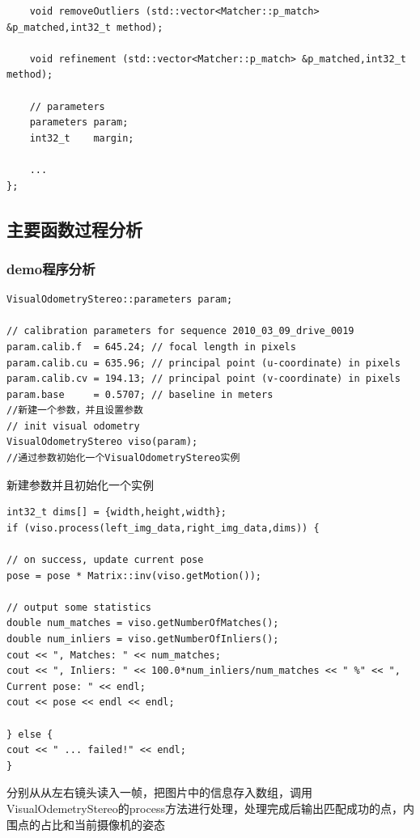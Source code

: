 \documentclass[UTF8]{ctexart}
\begin{document}
\begin{verbatim}
    void removeOutliers (std::vector<Matcher::p_match> &p_matched,int32_t method);

    void refinement (std::vector<Matcher::p_match> &p_matched,int32_t method);

    // parameters
    parameters param;
    int32_t    margin;
    
    ...
};

    \end{verbatim}
    \subsection{主要函数过程分析}
    \subsubsection{demo程序分析}
    \begin{verbatim}
VisualOdometryStereo::parameters param;

// calibration parameters for sequence 2010_03_09_drive_0019 
param.calib.f  = 645.24; // focal length in pixels
param.calib.cu = 635.96; // principal point (u-coordinate) in pixels
param.calib.cv = 194.13; // principal point (v-coordinate) in pixels
param.base     = 0.5707; // baseline in meters
//新建一个参数，并且设置参数
// init visual odometry
VisualOdometryStereo viso(param);
//通过参数初始化一个VisualOdometryStereo实例
    \end{verbatim}
    新建参数并且初始化一个实例
    \begin{verbatim}
int32_t dims[] = {width,height,width};
if (viso.process(left_img_data,right_img_data,dims)) {

// on success, update current pose
pose = pose * Matrix::inv(viso.getMotion());

// output some statistics
double num_matches = viso.getNumberOfMatches();
double num_inliers = viso.getNumberOfInliers();
cout << ", Matches: " << num_matches;
cout << ", Inliers: " << 100.0*num_inliers/num_matches << " %" << ", Current pose: " << endl;
cout << pose << endl << endl;

} else {
cout << " ... failed!" << endl;
}
    \end{verbatim}
    分别从从左右镜头读入一帧，把图片中的信息存入数组，调用VisualOdemetryStereo的process方法进行处理，处理完成后输出匹配成功的点，内围点的占比和当前摄像机的姿态
\end{document}
